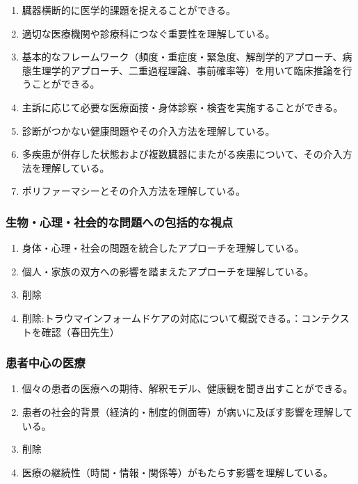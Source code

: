 \documentclass[
]{ltjsarticle}
\providecommand{\tightlist}{%
  \setlength{\itemsep}{0pt}\setlength{\parskip}{0pt}}
\begin{document}
\begin{enumerate}
\def\labelenumi{\arabic{enumi}.}
\tightlist
\item
  臓器横断的に医学的課題を捉えることができる。
\item
  適切な医療機関や診療科につなぐ重要性を理解している。
\item
  基本的なフレームワーク（頻度・重症度・緊急度、解剖学的アプローチ、病態生理学的アプローチ、二重過程理論、事前確率等）を用いて臨床推論を行うことができる。
\item
  主訴に応じて必要な医療面接・身体診察・検査を実施することができる。
\item
  診断がつかない健康問題やその介入方法を理解している。
\item
  多疾患が併存した状態および複数臓器にまたがる疾患について、その介入方法を理解している。
\item
  ポリファーマシーとその介入方法を理解している。
\end{enumerate}

\hypertarget{ux751fux7269ux5fc3ux7406ux793eux4f1aux7684ux306aux554fux984cux3078ux306eux5305ux62ecux7684ux306aux8996ux70b9}{%
\subsubsection{生物・心理・社会的な問題への包括的な視点}\label{ux751fux7269ux5fc3ux7406ux793eux4f1aux7684ux306aux554fux984cux3078ux306eux5305ux62ecux7684ux306aux8996ux70b9}}

\begin{enumerate}
\def\labelenumi{\arabic{enumi}.}
\tightlist
\item
  身体・心理・社会の問題を統合したアプローチを理解している。
\item
  個人・家族の双方への影響を踏まえたアプローチを理解している。
\item
  削除
\item
  削除:トラウマインフォームドケアの対応について概説できる。：コンテクストを確認（春田先生）
\end{enumerate}

\hypertarget{ux60a3ux8005ux4e2dux5fc3ux306eux533bux7642}{%
\subsubsection{患者中心の医療}\label{ux60a3ux8005ux4e2dux5fc3ux306eux533bux7642}}

\begin{enumerate}
\def\labelenumi{\arabic{enumi}.}
\tightlist
\item
  個々の患者の医療への期待、解釈モデル、健康観を聞き出すことができる。
\item
  患者の社会的背景（経済的・制度的側面等）が病いに及ぼす影響を理解している。
\item
  削除
\item
  医療の継続性（時間・情報・関係等）がもたらす影響を理解している。
\end{enumerate}
\end{document}
